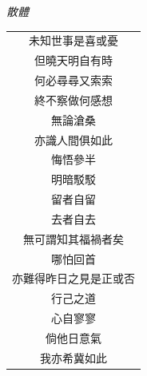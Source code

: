 \documentclass{ctexart}
\begin{document}
	\begin{titlepage}
		\thispagestyle{empty}
		
		\begingroup
		\setlength{\parindent}{0pt}
		\setlength{\parskip}{0pt}
		
		\vspace{3.0cm} 
		
		\begin{center}
			{\large \itshape 散體}
			\vspace{0.3cm}
			
			\begin{minipage}{\linewidth}
				\centering
				{\large \itshape
					\begin{tabular}{@{}c@{}}
						未知世事是喜或憂\\
						但曉天明自有時\\
						何必尋尋又索索\\
						終不察做何感想\\
						無論滄桑\\
						亦識人間俱如此\\
						悔悟參半\\
						明暗駁駁\\
						留者自留\\
						去者自去\\
						無可謂知其福禍者矣\\
						哪怕回首\\
						亦難得昨日之見是正或否\\
						行己之道\\
						心自寥寥\\
						倘他日意氣\\
						我亦希冀如此\\
					\end{tabular}
				}
			\end{minipage}
			
		\end{center}
		
		\endgroup
	\end{titlepage}
	
\end{document}
